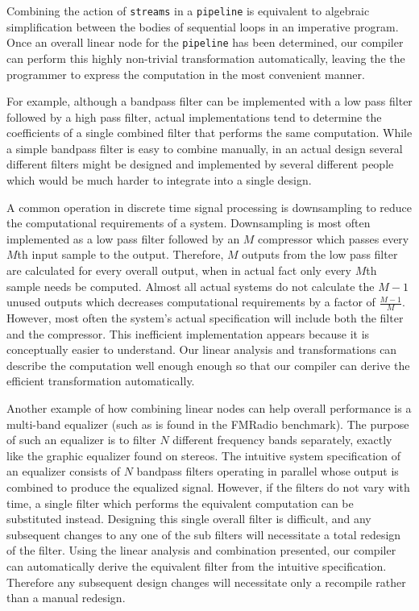 Combining the action of {\tt streams} in a {\tt pipeline} is equivalent 
to algebraic simplification between the bodies of sequential loops in 
an imperative program. Once an overall linear node for the
{\tt pipeline} has been determined, our compiler can perform this highly non-trivial 
transformation automatically, leaving the the programmer to express 
the computation in the most convenient manner.

For example, although a bandpass filter can be implemented with a low
pass filter followed by a high pass filter, actual implementations
tend to determine the coefficients of a single combined filter that 
performs the same computation. While a simple bandpass filter is 
easy to combine manually, in an actual design several different 
filters might be designed and implemented by several different people 
which would be much harder to integrate into a single design.

A common operation in discrete time signal processing is downsampling
to reduce the computational requirements of a system.
Downsampling is most often implemented as a low pass filter followed
by an $M$ compressor which passes every $M$th input sample to the
output.  Therefore, $M$ outputs from the
low pass filter are calculated for every overall output, when in actual fact
only every $M$th sample needs be computed.  Almost all actual systems 
do not calculate the $M-1$ unused outputs which decreases computational
requirements by a factor of $\frac{M-1}{M}$. However, most often 
the system's actual specification will include both the filter and the compressor. 
This inefficient implementation appears because it is
conceptually easier to understand. Our linear analysis and transformations
can describe the computation well enough enough so that our compiler can
derive the efficient transformation automatically.

Another example of how combining linear nodes can help overall performance
is a multi-band equalizer (such as is found in the
FMRadio benchmark).  The purpose of such an equalizer is to filter $N$
different frequency bands separately, exactly like the graphic equalizer found
on stereos. The intuitive system specification of an equalizer
consists of $N$ bandpass filters operating in parallel whose output is
combined to produce the equalized signal. However, if the filters do
not vary with time, a single filter which performs the equivalent
computation can be substituted instead. Designing this
single overall filter is difficult, and any subsequent changes to any
one of the sub filters will necessitate a total redesign of the
filter. Using the linear analysis and combination presented,
our compiler can automatically derive the equivalent filter from the
intuitive specification. Therefore any subsequent design changes will 
necessitate only a recompile rather than a manual redesign.


